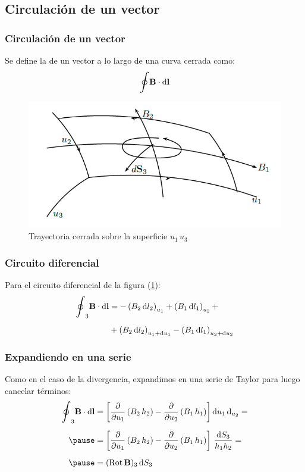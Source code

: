 \documentclass[12pt]{beamer}
\begin{document}
\subsection{Circulación de un vector}

\begin{frame}
\frametitle{Circulación de un vector}
Se define la  de un vector a lo largo de una curva cerrada como:
\pause
\begin{align*}
\scaleoint{6ex} \vb{B} \cdot \dd{\vb{l}}
\end{align*}
\pause
\begin{figure}[h!]
    \centering
    \includegraphics[scale=0.4]{Imagenes/Circulacion_Vector.png}
    \caption{Trayectoria cerrada sobre la superficie $u_{1} \, u_{3}$}
    \label{fig:figura_trayectoria_cerrada}
\end{figure}
\end{frame}
\begin{frame}
\frametitle{Circuito diferencial}
Para el circuito diferencial de la figura (\ref{fig:figura_trayectoria_cerrada}):
\pause
\begin{align*}
\scaleoint{6ex}_{3} \vb{B} \cdot \dd{\vb{l}} &= - \left( B_{2} \dd{l_{2}} \right)_{u_{1}} + \left( B_{1} \dd{l_{1}} \right)_{u_{2}} + \\[0.5em]
&+ \left( B_{2} \dd{l_{2}} \right)_{u_{1}+\dd{u_{1}}} - \left( B_{1} \dd{l_{1}} \right)_{u_{2}+\dd{u_{2}}}
\end{align*}
\end{frame}
\begin{frame}
\frametitle{Expandiendo en una serie}
Como en el caso de la divergencia, expandimos en una serie de Taylor para luego cancelar términos:
\pause
\begin{eqnarray*}
\begin{aligned}
\scaleoint{6ex}_{3} \vb{B} \cdot \dd{\vb{l}} &= \left[ \displaystyle \pdv{u_{1}} \left( B_{2} \, h_{2}\right) - \pdv{u_{2}} \left( B_{1} \, h_{1} \right) \right] \dd{u_{1}} \dd_{u_{2}} = \\[0.5em] \pause
&= \left[ \pdv{u_{1}} \left( B_{2} \, h_{2}\right) - \pdv{u_{2}} \left( B_{1} \, h_{1} \right) \right] \, \dfrac{\dd{S_{3}}}{h_{1} h_{2}} = \\[0.5em] \pause
&= ({\rm{Rot}} \, \vb{B})_{3} \dd{S_{3}}
\end{aligned}
\end{eqnarray*}
\end{frame}
\end{document}
